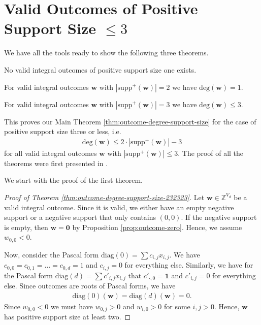 \chapter{Valid Outcomes of Positive Support Size \( \leq 3 \)}

We have all the tools ready to show the following three theorems. 

\begin{theorem}\label{thm:outcome-degree-support-size-232323}
    No valid integral outcomes of positive support size one exists.
\end{theorem}

\begin{theorem}\label{thm:outcome-degree-support-size-232323343}
    For valid integral outcomes \( \mathbf w \) with \( |\mathrm{supp}^+(\mathbf w)| = 2 \) we have \( \mathrm{deg}(\mathbf w) = 1 \).
\end{theorem}

\begin{theorem}
    For valid integral outcomes \( \mathbf w \) with \( |\mathrm{supp}^+(\mathbf w)| = 3 \) we have \( \mathrm{deg}(\mathbf w) \leq 3 \).
\end{theorem}

This proves our Main Theorem \ref{thm:outcome-degree-support-size} for the case of positive support size three or less, i.e. 
\begin{align*}
    \mathrm{deg}(\mathbf w) \leq 2 \cdot |\mathrm{supp}^+(\mathbf w)| - 3
\end{align*}
for all valid integral outcomes \( \mathbf w \) with \( |\mathrm{supp}^+(\mathbf w)| \leq 3 \). The proof of all the theorems were first presented in \cite{bik2022classifying}. 

We start with the proof of the first theorem.

\begin{proof}[Proof of Theorem \ref{thm:outcome-degree-support-size-232323}]
    Let \( \mathbf{w} \in \mathbb{Z}^{V_d} \) be a valid integral outcome. Since it is valid, we either have an empty negative support or a negative support that only contains \( (0,0) \). If the negative support is empty, then \( \mathbf{w} = \mathbf 0 \) by Proposition \ref{prop:outcome-zero}. Hence, we assume \( w_{0,0} < 0 \).

    Now, consider the Pascal form \( \mathrm{diag}(0) = \sum c_{i,j} x_{i,j} \). We have \( c_{0, 0} = c_{0, 1} = \dots = c_{0, d} = 1 \) and \( c_{i,j} = 0 \) for everything else. Similarly, we have for the Pascal form \( \mathrm{diag}(d) = \sum c'_{i,j} x_{i,j} \) that \( c'_{\cdot, 0} = \mathbf 1 \) and \( c'_{i,j} = 0 \) for everything else. Since outcomes are roots of Pascal forms, we have 
    \begin{align*}
        \mathrm{diag}(0)(\mathbf w) = \mathrm{diag}(d)(\mathbf w) = 0.
    \end{align*}
    Since \( w_{0,0} < 0 \) we must have \( w_{0,j} > 0 \) and \( w_{i, 0} > 0 \) for some \( i,j > 0 \). Hence, \( \mathbf{w} \) has positive support size at least two.
\end{proof}


